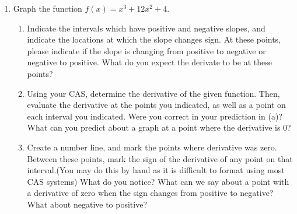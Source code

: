 \documentclass{ximera}
\begin{document}
\begin{enumerate}
\item{Graph the function $f(x)=x^3+12x^2+4$.}
\begin{enumerate}
\item{Indicate the intervals which have positive and negative slopes, and indicate the locations at which the slope changes sign. At these points, please indicate if the slope is changing from positive to negative or negative to positive. What do you expect the derivate to be at these points?}
\item{Using your CAS, determine the derivative of the given function. Then, evaluate the derivative at the points you indicated, as well as a point on each interval you indicated. Were you correct in your prediction in (a)? What can you predict about a graph at a point where the derivative is 0?}
\item{Create a number line, and mark the points where derivative was zero. Between these points, mark the sign of the derivative of any point on that interval.(You may do this by hand as it is difficult to format using most CAS systems) What do you notice? What can we say about a point with a derivative of zero when the sign changes from positive to negative? What about negative to positive?}
\end{enumerate}


\end{enumerate}
\end{document}
